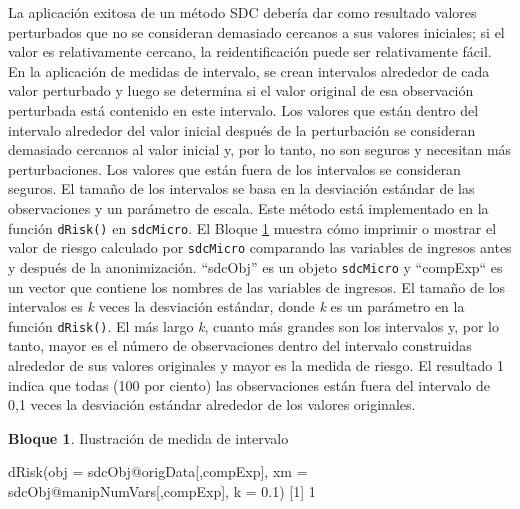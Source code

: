 \documentclass[
]{book}
\newenvironment{Shaded}{\begin{snugshade}}{\end{snugshade}}
\newcommand{\AttributeTok}[1]{\textcolor[rgb]{0.77,0.63,0.00}{#1}}
\newcommand{\DecValTok}[1]{\textcolor[rgb]{0.00,0.00,0.81}{#1}}
\newcommand{\FloatTok}[1]{\textcolor[rgb]{0.00,0.00,0.81}{#1}}
\newcommand{\FunctionTok}[1]{\textcolor[rgb]{0.00,0.00,0.00}{#1}}
\newcommand{\NormalTok}[1]{#1}
\newcommand{\SpecialCharTok}[1]{\textcolor[rgb]{0.00,0.00,0.00}{#1}}
\theoremstyle{definition}
\theoremstyle{definition}
\newtheorem{example}{Bloque}[chapter]
\theoremstyle{definition}
\theoremstyle{definition}
\theoremstyle{remark}
\begin{document}
La aplicación exitosa de un método SDC debería dar como resultado valores perturbados que no se consideran demasiado cercanos a sus valores iniciales; si el valor es relativamente cercano, la reidentificación puede ser relativamente fácil. En la aplicación de medidas de intervalo, se crean intervalos alrededor de cada valor perturbado y luego se determina si el valor original de esa observación perturbada está contenido en este intervalo. Los valores que están dentro del intervalo alrededor del valor inicial después de la perturbación se consideran demasiado cercanos al valor inicial y, por lo tanto, no son seguros y necesitan más perturbaciones. Los valores que están fuera de los intervalos se consideran seguros. El tamaño de los intervalos se basa en la desviación estándar de las observaciones y un parámetro de escala. Este método está implementado en la función \texttt{dRisk()} en \texttt{sdcMicro}. El Bloque \ref{exm:bloqueMR7} muestra cómo imprimir o mostrar el valor de riesgo calculado por \texttt{sdcMicro} comparando las variables de ingresos antes y después de la anonimización. ``sdcObj'' es un objeto \texttt{sdcMicro} y ``compExp`` es un vector que contiene los nombres de las variables de ingresos. El tamaño de los intervalos es \emph{k} veces la desviación estándar, donde \emph{k} es un parámetro en la función \texttt{dRisk()}. El más largo \emph{k}, cuanto más grandes son los intervalos y, por lo tanto, mayor es el número de observaciones dentro del intervalo construidas alrededor de sus valores originales y mayor es la medida de riesgo. El resultado 1 indica que todas (100 por ciento) las observaciones están fuera del intervalo de 0,1 veces la desviación estándar alrededor de los valores originales.

\begin{example}
\protect\hypertarget{exm:bloqueMR7}{}\label{exm:bloqueMR7}Ilustración de medida de intervalo
\end{example}

\begin{Shaded}
\begin{Highlighting}[]
 \FunctionTok{dRisk}\NormalTok{(}\AttributeTok{obj =}\NormalTok{ sdcObj}\SpecialCharTok{@}\NormalTok{origData[,compExp], }\AttributeTok{xm =}\NormalTok{ sdcObj}\SpecialCharTok{@}\NormalTok{manipNumVars[,compExp],}
       \AttributeTok{k =} \FloatTok{0.1}\NormalTok{)}
\NormalTok{ [}\DecValTok{1}\NormalTok{] }\DecValTok{1}
\end{Highlighting}
\end{Shaded}
\end{document}

